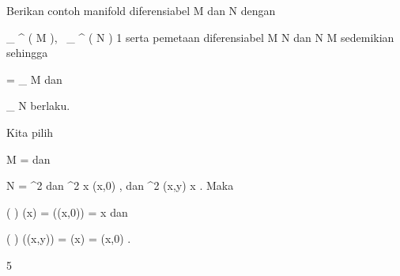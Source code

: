 {

Berikan contoh manifold diferensiabel
\mathkor {} {M} {dan} {N} {}
dengan

\mavergleichskette
{\vergleichskette
{ _{  } ^{  }  \left(   M   \right), \, _{  } ^{  }  \left(   N   \right)
}
{ \geq }{ 1
}
{  }{
}
{    }{
}
{   }{
}
}
{}{}{}
serta pemetaan diferensiabel
\maabb {\varphi} { M } { N
} {}
dan
\maabb {\psi} { N } { M
} {}
sedemikian sehingga

\mavergleichskette
{\vergleichskette
{ \psi \circ \varphi
}
{ = }{
_{ M }
}
{  }{
}
{    }{
}
{   }{
}
}
{}{}{}
dan

\mavergleichskette
{\vergleichskette
{\varphi \circ  \psi
}
{ \neq }{
_{ N }
}
{  }{
}
{    }{
}
{   }{
}
}
{}{}{}
berlaku.

}
{

Kita pilih

\mavergleichskette
{\vergleichskette
{M
}
{ = }{\R
}
{ }{
}
{ }{
}
{ }{
}
}
{}{}{}
dan

\mavergleichskette
{\vergleichskette
{N
}
{ = }{\R^2
}
{ }{
}
{ }{
}
{ }{
}
}
{}{}{}
dan
\maabbeledisp {\varphi} {\R} {\R^2
} { x } {(x,0)
} {,}
dan
\maabbeledisp {\psi} {\R^2} {\R
} {(x,y)} { x
} {.}
Maka

\mavergleichskettedisp
{\vergleichskette
{ \left( \psi \circ \varphi \right) (x)
}
{ =} { \psi((x,0))
}
{ =} { x
}
{ } {
}
{ } {
}
}
{}{}{}
dan

\mavergleichskettedisp
{\vergleichskette
{ \left(  \varphi  \circ \psi  \right) ((x,y))
}
{ =} { \varphi (x)
}
{ =} {(x,0)
}
{ } {
}
{ } {
}
}
{}{}{.}

 }



{5}

